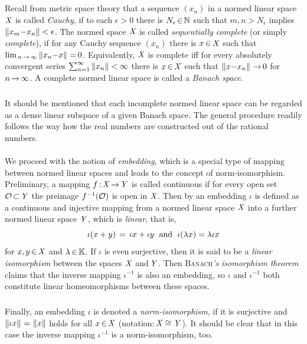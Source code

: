 \documentclass[11pt,twoside]{article}
\begin{document}
\subsection{} %
Recall from metric space theory
that a sequence $(x_n)$ in a normed linear space $\mathit{X}$
is called \textit{Cauchy},
if to each $\epsilon > 0$ there is $N_{\epsilon} {\,\in\,} {\mathbb{N}}$
such that $m,n > N_{\epsilon}$ implies $\left\lVert x_m{-}x_n \right\rVert < \epsilon$.
The normed space $\mathit{X}$ is called \textit{sequentially complete}
(or simply \textit{complete}),
if for any Cauchy sequence $(x_n)$ %
there is $x {\,\in\,} \mathit{X}$
such that $\lim_{\,n {\,\to\,} \infty} \left\lVert x_n{-}x \right\rVert {\,=\,} 0$.
Equivalently,
$\mathit{X}$ is complete
iff
for every absolutely convergent series
$\sum_{n=1}^{\infty} \left\lVert x_n \right\rVert < \infty$
there is $x {\,\in\,} \mathit{X}$ such that $\left\lVert x{-}x_n \right\rVert {\,\to\,} 0$ for $n {\,\to\,} \infty$.
A complete normed linear space is called a \textit{Banach space}.

\subparagraph{}
It should be mentioned that each incomplete normed linear space can be regarded
as a dense linear subspace of a given Banach space.
The general procedure readily follows the way
how the real numbers are constructed out of the rational numbers.

\paragraph{} %
We proceed with the notion of \textit{embedding},
which is a special type of mapping between normed linear spaces
and leads to the concept of {norm-isomorphism}.
Preliminary,
a mapping $f {\,:\,} \mathit{X} {\,\to\,} \mathit{Y}$ is called continuous
if for every open set $\mathcal{O} {\,\subset\,} \mathit{Y}$
the preimage $f^{-1}(\mathcal{O})$ is open in $\mathit{X}$.
Then by an embedding $\iota$ is defined as
a continuous and injective mapping from a normed linear space $\mathit{X}$
into a further normed linear space $\mathit{Y}$,
which is \textit{linear},
that is,
\[
\iota(x + y) \,=\, \iota x + \iota y \;\mbox{ and }\; \iota(\lambda x) = \lambda \iota x
\]
for $x,y {\,\in\,} \mathit{X}$ and $\lambda {\,\in\,} {\mathbb{K}}$.
If $\iota$ is even surjective,
then it is said to be a \textit{linear isomorphism}
between the spaces $\mathit{X}$ and\,$\mathit{Y}$.
Then \textsc{Banach}\textit{'s isomorphism theorem} claims that
the inverse mapping $\iota^{-1}$ is also an embedding,
so $\iota$ and $\iota^{-1}$ both constitute linear homeomorphisms
between these spaces.

\subparagraph{} %
Finally,
an embedding $\iota$ is denoted a \textit{norm-isomorphism},
if it is surjective and $\left\lVert \iota x \right\rVert {\,=\,} \left\lVert x \right\rVert$ holds
for all $x {\,\in\,} \mathit{X}$ (notation:\,$\mathit{X} \cong \mathit{Y}$).
It should be clear that
in this case the inverse mapping $\iota^{-1}$ is a norm-isomorphism,
too.
\end{document}
